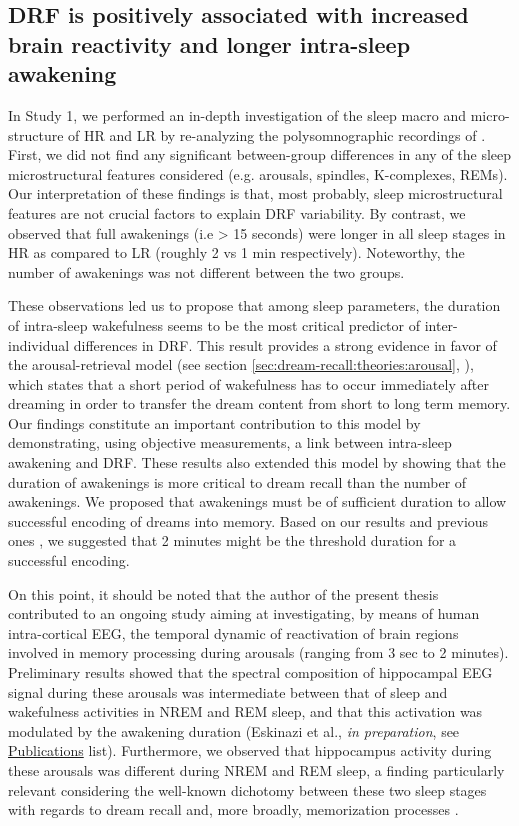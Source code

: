 \subsection{DRF is positively associated with increased brain reactivity and longer intra-sleep awakening}
\label{disc:drf:summary:arousals}

In Study 1, we performed an in-depth investigation of the sleep macro and micro-structure of HR and LR by re-analyzing the polysomnographic recordings of \citet{eichenlaub_brain_2014}. First, we did not find any significant between-group differences in any of the sleep microstructural features considered (e.g. arousals, spindles, K-complexes, REMs). Our interpretation of these findings is that, most probably, sleep microstructural features are not crucial factors to explain DRF variability.
By contrast, we observed that full awakenings (i.e > 15 seconds) were longer in all sleep stages in HR as compared to LR (roughly 2 vs 1 min respectively). Noteworthy, the number of awakenings was not different between the two groups.

These observations led us to propose that among sleep parameters, the duration of intra-sleep wakefulness seems to be the most critical predictor of inter-individual differences in DRF. This result provides a strong evidence in favor of the arousal-retrieval model (see section \ref{sec:dream-recall:theories:arousal}, \citealp{koulack_dream_1976}), which states that a short period of wakefulness has to occur immediately after dreaming in order to transfer the dream content from short to long term memory. Our findings constitute an important contribution to this model by demonstrating, using objective measurements, a link between intra-sleep awakening and DRF. These results also extended this model by showing that the duration of awakenings is more critical to dream recall than the number of awakenings. We proposed that awakenings must be of sufficient duration to allow successful encoding of dreams into memory. Based on our results and previous ones \citep{campbell_perception_1981}, we suggested that 2 minutes might be the threshold duration for a successful encoding.

On this point, it should be noted that the author of the present thesis contributed to an ongoing study aiming at investigating, by means of human intra-cortical EEG, the temporal dynamic of reactivation of brain regions involved in memory processing during arousals (ranging from 3 sec to 2 minutes). Preliminary results showed that the spectral composition of hippocampal EEG signal during these arousals was intermediate between that of sleep and wakefulness activities in NREM and REM sleep, and that this activation was modulated by the awakening duration (Eskinazi et al., \emph{in preparation}, see \hyperref[sec:publications]{Publications} list). Furthermore, we observed that hippocampus activity during these arousals was different during NREM and REM sleep, a finding particularly relevant considering the well-known dichotomy between these two sleep stages with regards to dream recall and, more broadly, memorization processes \citep{nielsen_review_2000, conduit_poor_2004}.

